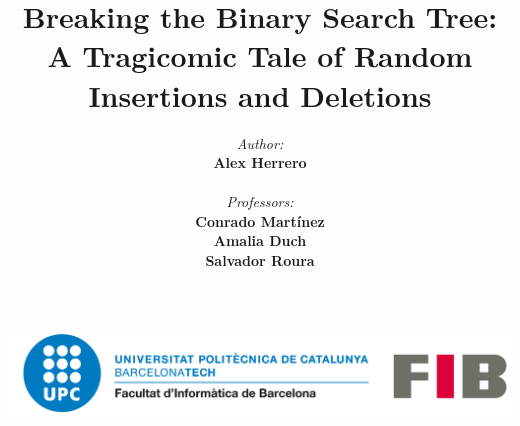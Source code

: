 \documentclass{beamer}
\begin{document}

\title[Breaking the Binary Search Tree: A Tragicomic Tale of Random Insertions and Deletions]{
    Breaking the Binary Search Tree: A Tragicomic Tale of Random Insertions and Deletions
}

\author[A.Herrero]{
  \begin{minipage}[t]{0.5\textwidth}
    \raggedright
    \small \textit{Author:} \\
    \textbf{Alex Herrero} \\
    \vspace{1cm} %
  \end{minipage}%
  \begin{minipage}[t]{0.5\textwidth}
    \raggedleft
    \small \textit{Professors:} \\
    \textbf{Conrado Martínez} \\
    \textbf{Amalia Duch} \\
    \textbf{Salvador Roura} \\
  \end{minipage} \\
  \vspace{1cm} %
  \begin{center}
    \includegraphics[scale=0.15]{logo-upc.png}
  \end{center}
}

\beamertemplatenavigationsymbolsempty




\AtBeginSection[ ]
{
    \begin{frame}
        \tableofcontents[currentsection]
    \end{frame}
}
\end{document}
